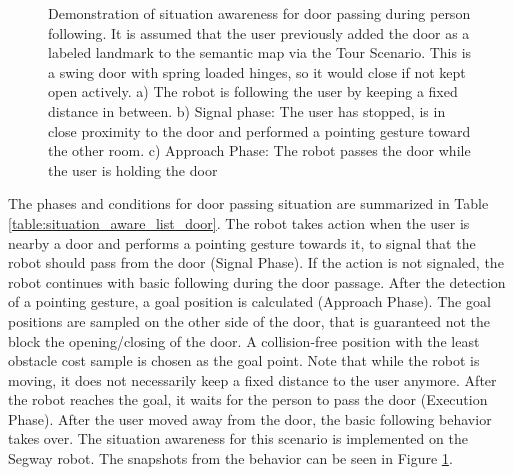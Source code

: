 \begin{figure}[ht!]
{        }
    \caption{Demonstration of situation awareness for door passing during person following. It is assumed that the user previously added the door as a labeled landmark to the semantic map via the Tour Scenario. This is a swing door with spring loaded hinges, so it would close if not kept open actively. a) The robot is following the user by keeping a fixed distance in between. b) Signal phase: The user has stopped, is in close proximity to the door and performed a pointing gesture toward the other room. c) Approach Phase: The robot passes the door while the user is holding the door}
   \label{fig:situtation_aware_door_passing}
\end{figure}

The phases and conditions for door passing situation are summarized in Table \ref{table:situation_aware_list_door}. The robot takes action when the user is nearby a door and performs a pointing gesture towards it, to signal that the robot should pass from the door (Signal Phase). If the action is not signaled, the robot continues with basic following during the door passage. After the detection of a pointing gesture, a goal position is calculated (Approach Phase). The goal positions are sampled on the other side of the door, that is guaranteed not the block the opening/closing of the door. A collision-free position with the least obstacle cost sample is chosen as the goal point. Note that while the robot is moving, it does not necessarily keep a fixed distance to the user anymore. After the robot reaches the goal, it waits for the person to pass the door (Execution Phase). After the user moved away from the door, the basic following behavior takes over. The situation awareness for this scenario is implemented on the Segway robot. The snapshots from the behavior can be seen in Figure \ref{fig:situtation_aware_door_passing}.
